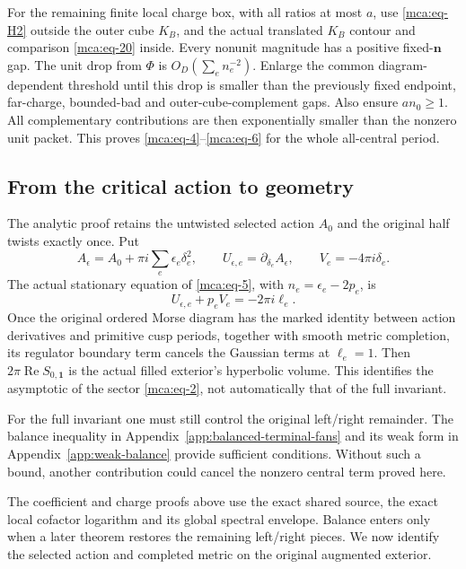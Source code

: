 For the remaining finite local charge box, with all ratios at most
\(a\), use \eqref{mca:eq-H2} outside the outer cube \(K_B\), and the
actual translated \(K_B\) contour and comparison \eqref{mca:eq-20}
inside. Every nonunit magnitude has a positive fixed-\(\mathbf n\) gap.
The unit drop from \(\Phi\) is \(O_D(\sum_e n_e^{-2})\). Enlarge the
common diagram-dependent threshold until this drop is smaller than the
previously fixed endpoint, far-charge, bounded-bad and
outer-cube-complement gaps. Also ensure \(a n_0\ge1\). All complementary
contributions are then exponentially smaller than the nonzero unit
packet. This proves \eqref{mca:eq-4}--\eqref{mca:eq-6} for the whole
all-central period.

\subsection{From the critical action to geometry}\label{mca:sec-8}

The analytic proof retains the untwisted selected action \(A_0\) and the
original half twists exactly once. Put \begin{equation}\label{mca:eq-25}
A_{\epsilon}=A_0+\pi i\sum_e\epsilon_e\delta_e^2,
 \qquad U_{\epsilon,e}=\partial_{\delta_e}A_{\epsilon},
 \qquad V_e=-4\pi i\delta_e.
\end{equation} The actual stationary equation of \eqref{mca:eq-5}, with
\(n_e=\epsilon_e-2p_e\), is \begin{equation}\label{mca:eq-26}
U_{\epsilon,e}+p_eV_e=-2\pi i\ell_e.
\end{equation} Once the original ordered Morse diagram has the marked
identity between action derivatives and primitive cusp periods,
together with smooth metric completion, its
regulator boundary term cancels the Gaussian terms at \(\ell_e=1\). Then
\(2\pi\operatorname{Re}S_{0,\mathbf1}\) is the actual filled exterior's
hyperbolic volume. This identifies the asymptotic of the sector
\eqref{mca:eq-2}, not automatically that of the full invariant.

For the full invariant one must still control the original left/right
remainder. The balance inequality in Appendix~\ref{app:balanced-terminal-fans}
and its weak form in Appendix~\ref{app:weak-balance} provide sufficient
conditions. Without such a bound, another contribution could cancel
the nonzero central term proved here.

The coefficient and charge proofs above use the exact shared source,
the exact local cofactor logarithm and its global spectral envelope.
Balance enters only when a later theorem restores the remaining
left/right pieces. We now identify the selected action and completed
metric on the original augmented exterior.

